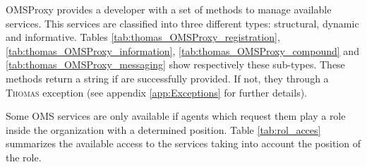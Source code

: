 OMSProxy provides a developer with a set of methods to manage available services. This services are classified into three different types: structural, dynamic and informative. Tables \ref{tab:thomas_OMSProxy_registration}, \ref{tab:thomas_OMSProxy_information}, \ref{tab:thomas_OMSProxy_compound} and \ref{tab:thomas_OMSProxy_messaging} show respectively these sub-types. These methods return a string if are successfully provided. If not, they through a \textsc{Thomas} exception (see appendix \ref{app:Exceptions} for further details). 

Some OMS services are only available if  agents which request them play a role inside the organization with a determined position. Table \ref{tab:rol_acces} summarizes  the available access to the services taking into account the position of the role.


